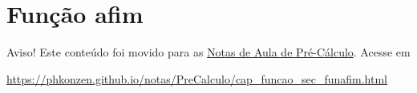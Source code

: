 


\section{Função afim}\label{cap_funcao_sec_funafim}

\begin{center}
  Aviso! Este conteúdo foi movido para as \href{https://phkonzen.github.io/notas/PreCalculo/main.html}{Notas de Aula de Pré-Cálculo}. Acesse em

  \url{https://phkonzen.github.io/notas/PreCalculo/cap_funcao_sec_funafim.html}
\end{center}



